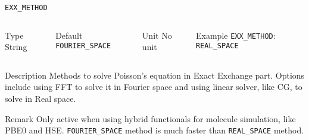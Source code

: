 \begin{frame}[allowframebreaks]{\texttt{EXX\_METHOD}} \label{EXX_METHOD}
\vspace*{-12pt}
\begin{columns}
\begin{block}{Type}
String
\end{block}

\begin{block}{Default}
\texttt{FOURIER\_SPACE}
\end{block}

\begin{block}{Unit}
No unit
\end{block}

\begin{block}{Example}
\texttt{EXX\_METHOD}: \texttt{REAL\_SPACE}
\end{block}
\end{columns}

\begin{block}{Description}
Methods to solve Poisson's equation in Exact Exchange part. Options include using FFT to solve it in Fourier space and using linear solver, like CG, to solve in Real space.
\end{block}

\begin{block}{Remark}
Only active when using hybrid functionals for molecule simulation, like PBE0 and HSE. 
\texttt{FOURIER\_SPACE} method is much faster than \texttt{REAL\_SPACE} method.
\end{block}

\end{frame}

